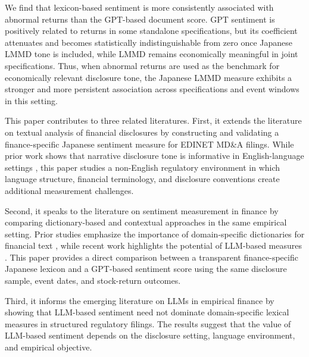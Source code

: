 We find that lexicon-based sentiment is more consistently associated with abnormal returns than the GPT-based document score. GPT sentiment is positively related to returns in some standalone specifications, but its coefficient attenuates and becomes statistically indistinguishable from zero once Japanese LMMD tone is included, while LMMD remains economically meaningful in joint specifications. Thus, when abnormal returns are used as the benchmark for economically relevant disclosure tone, the Japanese LMMD measure exhibits a stronger and more persistent association across specifications and event windows in this setting.

This paper contributes to three related literatures. First, it extends the literature on textual analysis of financial disclosures by constructing and validating a finance-specific Japanese sentiment measure for EDINET MD\&A filings. While prior work shows that narrative disclosure tone is informative in English-language settings \citep{tetlock2007giving,tetlock2008morethanwords,brown2011mda,feldman2010tone}, this paper studies a non-English regulatory environment in which language structure, financial terminology, and disclosure conventions create additional measurement challenges.

Second, it speaks to the literature on sentiment measurement in finance by comparing dictionary-based and contextual approaches in the same empirical setting. Prior studies emphasize the importance of domain-specific dictionaries for financial text \citep{loughran2011liability,henry2016measuring}, while recent work highlights the potential of LLM-based measures \citep{siano2025news,okada2025words}. This paper provides a direct comparison between a transparent finance-specific Japanese lexicon and a GPT-based sentiment score using the same disclosure sample, event dates, and stock-return outcomes.

Third, it informs the emerging literature on LLMs in empirical finance by showing that LLM-based sentiment need not dominate domain-specific lexical measures in structured regulatory filings. The results suggest that the value of LLM-based sentiment depends on the disclosure setting, language environment, and empirical objective.